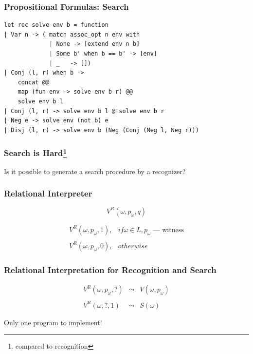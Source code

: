 \documentclass[xcolor=table]{beamer}
\begin{document}
\begin{frame}[fragile]
  \transwipe[direction=90]
  \frametitle{Propositional Formulas: Search}

\begin{lstlisting}
let rec solve env b = function
| Var n -> ( match assoc_opt n env with 
             | None -> [extend env n b]
             | Some b' when b == b' -> [env] 
             | _   -> [])
| Conj (l, r) when b ->
    concat @@ 
    map (fun env -> solve env b r) @@ 
    solve env b l
| Conj (l, r) -> solve env b l @ solve env b r
| Neg e -> solve env (not b) e
| Disj (l, r) -> solve env b (Neg (Conj (Neg l, Neg r))) 
\end{lstlisting}
\end{frame}

\begin{frame}[fragile]
  \transwipe[direction=90]
  \frametitle{Search is Hard\footnote{compared to recognition}}
\begin{center}
Is it possible to generate a search procedure by a recognizer? 
\end{center}
\end{frame}


\begin{frame}[fragile]
  \transwipe[direction=90]
  \frametitle{Relational Interpreter}
\[ V^R(\omega, p_{\omega}, q) \]

\[
\begin{array}{ll}
  V^R(\omega, p_{\omega}, 1), & if \omega \in L, p_{\omega} \text{ --- witness} \\
  & \\
  V^R(\omega, p_{\omega}, 0), & otherwise
\end{array}  
\] 
\end{frame}


\begin{frame}[fragile]
  \transwipe[direction=90]
  \frametitle{Relational Interpretation for Recognition and Search}

\[
\begin{array}{rcl}
 V^R(\omega, p_{\omega}, ?) & \leadsto & V(\omega, p_{\omega}) \\
 & \\ 
 V^R(\omega, ?, 1) & \leadsto & S(\omega) 
\end{array} 
\]

\vspace*{\fill}

\begin{center} Only one program to implement! \end{center}
\end{frame}
\end{document}
